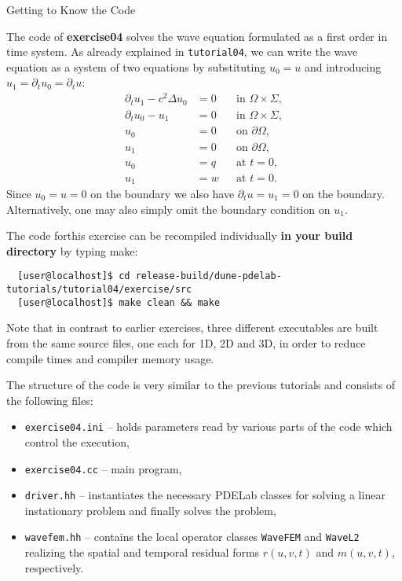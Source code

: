 \documentclass[12pt,a4paper]{article}
\begin{document}
\begin{Exercise}{Getting to Know the Code}

  \lstset{language=bash}

  The code of \textbf{exercise04} solves the wave equation formulated as a first order in time system. As already explained in \lstinline{tutorial04}, we can write the wave equation as a system of two equations by substituting $u_0=u$ and introducing $u_1=\partial_t u_0 =\partial_t u$:
\begin{subequations}
\label{eq:SystemForm1}
\begin{align}
\partial_t u_1 - c^2\Delta u_0 &=0 &&\text{in $\Omega\times\Sigma$}, \label{eq:2a}\\
\partial_t u_0 - u_1 &=0 &&\text{in $\Omega\times\Sigma$}, \label{eq:2b}\\
u_0 &= 0 &&\text{on $\partial\Omega$},\\
u_1 &= 0 &&\text{on $\partial\Omega$},\\
u_0 &= q &&\text{at $t=0$},\\
u_1 &= w &&\text{at $t=0$}.
\end{align}
\end{subequations}
Since $u_0=u=0$ on the boundary we also have $\partial_t u = u_1 = 0$ on the boundary.
Alternatively, one may also simply omit the boundary condition on $u_1$.


  The code forthis exercise can be recompiled individually \textbf{in
    your build directory} by typing make:
  \begin{lstlisting}
  [user@localhost]$ cd release-build/dune-pdelab-tutorials/tutorial04/exercise/src
  [user@localhost]$ make clean && make
  \end{lstlisting}

  Note that in contrast to earlier exercises, three different executables are built from the same source files,
  one each for 1D, 2D and 3D, in order to reduce compile times and compiler memory usage.

  The structure of the code is very similar to the previous tutorials and
  consists of the following files:
  \begin{itemize}
  \item \lstinline!exercise04.ini! -- holds parameters read by various parts of the code which control the execution,
  \item \lstinline!exercise04.cc! -- main program,
  \item \lstinline!driver.hh! -- instantiates the necessary PDELab classes for solving a linear instationary problem and finally solves the problem,
  \item \lstinline!wavefem.hh! -- contains the local operator classes \lstinline!WaveFEM! and \lstinline!WaveL2! realizing the spatial and temporal residual forms $r(u,v,t)$ and $m(u,v,t)$, respectively.
  \end{itemize}


\end{Exercise}
\end{document}
